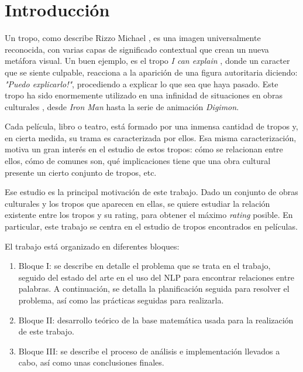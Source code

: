\chapter{Introducción}

Un tropo, como describe Rizzo Michael \cite{rizzo2013art}, es una imagen
universalmente reconocida, con varias capas de significado contextual que
crean un nueva metáfora visual. Un buen ejemplo, es el tropo \emph{I can
    explain} \cite{tropo:ICanExplain}, donde un caracter que se siente culpable,
reacciona a la aparición de una figura autoritaria diciendo: \emph{"Puedo
    explicarlo!"}, procediendo a explicar lo que sea que haya pasado. Este tropo ha
sido enormemente utilizado en una infinidad de situaciones en obras culturales
\cite{tropo:ICanExplain}, desde \emph{Iron Man} hasta la serie de animación
\emph{Digimon}.

Cada película, libro o teatro, está formado por una inmensa cantidad de tropos
y, en cierta medida, su trama es caracterizada por ellos. Esa misma
caracterización, motiva un gran interés en el estudio de estos tropos: cómo se
relacionan entre ellos, cómo de comunes son, qué implicaciones tiene que una
obra cultural presente un cierto conjunto de tropos, etc.

Ese estudio es la principal motivación de este trabajo. Dado un conjunto de
obras culturales y los tropos que aparecen en ellas, se quiere estudiar la
relación existente entre los tropos y su rating, para obtener el máximo \emph
{rating} posible. En particular, este trabajo se centra en el estudio de tropos
encontrados en películas.

El trabajo está organizado en diferentes bloques:

\begin{enumerate}
    \item Bloque I: se describe en detalle el problema que se trata en el
          trabajo, seguido del estado del arte en el uso del NLP para encontrar
          relaciones entre palabras. A continuación, se detalla la planificación
          seguida para resolver el problema, así como las prácticas seguidas para
          realizarla.
    \item Bloque II: desarrollo teórico de la base matemática usada para la
          realización de este trabajo.
    \item Bloque III: se describe el proceso de análisis e implementación
          llevados a cabo, así como unas conclusiones finales.
\end{enumerate}

